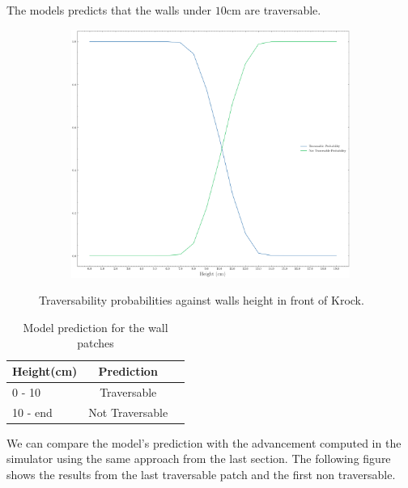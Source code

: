 \documentclass[../document.tex]{subfiles}
\begin{document}
The models predicts that the walls under $10$cm are traversable.
\begin{figure}[H]
    \centering
\begin{subfigure}[b]{1\textwidth}
    \includegraphics[width=\linewidth]{../img/5/custom_patches/walls_increasing/predictions.png}
    \end{subfigure}
    \caption{Traversability probabilities against walls height in front of Krock.}
\end{figure}

\begin{table}[H]
    \centering
    \begin{tabular}{l|cc}
        Height(cm) & Prediction \\ 
        \hline
        0 - 10  & Traversable \\ 
        10 - end & Not Traversable \\ 
        \hline
    \end{tabular}
    \caption{Model prediction for the wall patches}
\end{table}
We can compare the model's prediction with the advancement computed in the simulator using the same approach from the last section. The following figure shows the results from the last traversable patch and the first non traversable.
\end{document}
